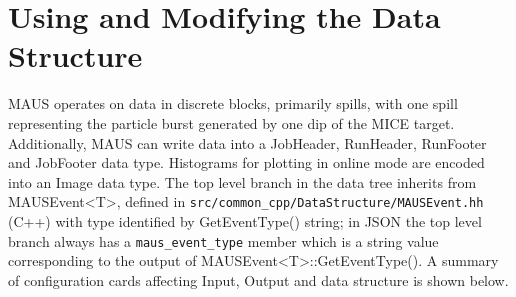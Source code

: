 \chapter{Using and Modifying the Data Structure}
\label{chapter:data_structure}
MAUS operates on data in discrete blocks, primarily spills, with one spill representing the particle burst generated by one dip of the MICE target. Additionally, MAUS can write data into a JobHeader, RunHeader, RunFooter and JobFooter data type. Histograms for plotting in online mode are encoded into an Image data type. The top level branch in the data tree inherits from MAUSEvent<T>, defined in \verb|src/common_cpp/DataStructure/MAUSEvent.hh| (C++) with type identified by GetEventType() string; in JSON the top level branch always has a \verb|maus_event_type| member which is a string value corresponding to the output of MAUSEvent<T>::GetEventType(). A summary of configuration cards affecting Input, Output and data structure is shown below.


